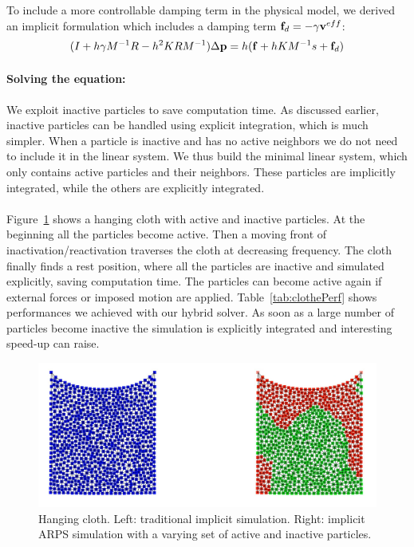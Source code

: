 To include a more controllable damping term in the physical model, we derived an implicit formulation which includes a damping term $\mathbf{f}_{d} = -\gamma \mathbf{v}^{eff}$:
\begin{equation}
	\label{eq:arpsLinearSystemDamped}
	( I + h\gamma M^{-1}R -h^{2}KRM^{-1} ) \Delta \mathbf{p} = h( \mathbf{f} + h KM^{-1}s + \mathbf{f}_{d})
\end{equation}

\paragraph*{Solving the equation:}
We exploit inactive particles to save computation time.
As discussed earlier, inactive particles can be handled using explicit integration, which is much simpler.
When a particle is inactive and has no active neighbors we do not need to include it in the linear system.
We thus build the minimal linear system, which only contains active particles and their neighbors.
These particles are implicitly integrated, while the others are explicitly integrated.
\\ \\
Figure~\ref{fig:clothARPS} shows a hanging cloth with active and inactive particles.
At the beginning all the particles become active. Then a moving front of inactivation/reactivation traverses the cloth at decreasing frequency. The cloth finally finds a rest position, where all the particles are inactive and simulated explicitly, saving computation time. The particles can become active again if external forces or imposed motion are applied.
Table~\ref{tab:clothePerf} shows performances we achieved with our hybrid solver.
As soon as a large number of particles become inactive the simulation is explicitly integrated and interesting speed-up can raise.

\begin{figure}[!h]
	\centering
	\includegraphics[width=0.8\linewidth]{images/arps-vriphys2013/Square3.jpg}
	\caption[ARPS: ARPS cloth simulation]{\label{fig:clothARPS} Hanging cloth. Left: traditional implicit simulation. Right: implicit ARPS simulation with a varying set of active and inactive particles. }
\end{figure}

